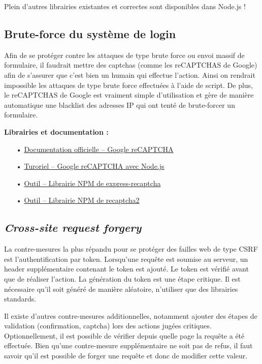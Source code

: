 Plein d'autres librairies existantes et correctes sont disponibles dans Node.js !

\subsection{Brute-force du système de login}
\label{ssec:cm-bruteforce}

Afin de se protéger contre les attaques de type brute force ou envoi massif de formulaire, il faudrait mettre des captchas (comme les reCAPTCHAS de Google) afin de s'assurer que c'est bien un humain qui effectue l'action. Ainsi on rendrait impossible les attaques de type brute force effectuées à l'aide de script. De plus, le reCAPTCHAS de Google est vraiment simple d'utilisation et gère de manière automatique une blacklist des adresses IP qui ont tenté de brute-forcer un formulaire. 

\medskip
\textbf{Librairies et documentation :}

\begin{itemize}
\item[•] \href{https://www.google.com/recaptcha/intro/v3beta.html}{Documentation officielle -- Google reCAPTCHA}
\item[•] \href{https://codeforgeek.com/2016/03/google-recaptcha-node-js-tutorial/}{Turoriel -- Google reCAPTCHA avec Node.js}
\item[•] \href{https://www.npmjs.com/package/express-recaptcha}{Outil -- Librairie NPM de express-recaptcha}
\item[•] \href{https://www.npmjs.com/package/recaptcha2}{Outil -- Librairie NPM de recaptcha2}
\end{itemize}

\subsection{\emph{Cross-site request forgery}}
\label{ssec:cm-csrf}

La contre-mesures la plus répandu pour se protéger des failles web de type CSRF est l'authentification par token. Lorsqu'une requête est soumise au serveur, un header supplémentaire contenant le token est ajouté. Le token est vérifié avant que de réaliser l'action. La génération du token est une étape critique. Il est nécessaire qu'il soit généré de manière aléatoire, n'utiliser que des librairies standards.

Il existe d'autres contre-mesures additionnelles, notamment ajouter des étapes de validation (confirmation, captcha) lors des actions jugées critiques. Optionnellement, il est possible de vérifier depuis quelle page la requête a été effectuée. Bien qu'une contre-mesure supplémentaire ne soit pas de refus, il faut savoir qu'il est possible de forger une requête et donc de modifier cette valeur.

